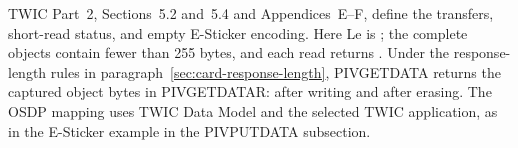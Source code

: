 TWIC Part~2, Sections~5.2 and~5.4 and Appendices~E--F, define the transfers,
short-read status, and empty E-Sticker encoding. Here Le is ;
the complete objects contain fewer than 255 bytes, and each read returns
. Under the response-length rules in
paragraph~\ref{sec:card-response-length}, PIVGETDATA
 returns the captured object bytes in
PIVGETDATAR:  after writing and
 after erasing. The OSDP mapping uses TWIC Data Model
 and the selected TWIC application, as in the E-Sticker example in
the PIVPUTDATA subsection.
